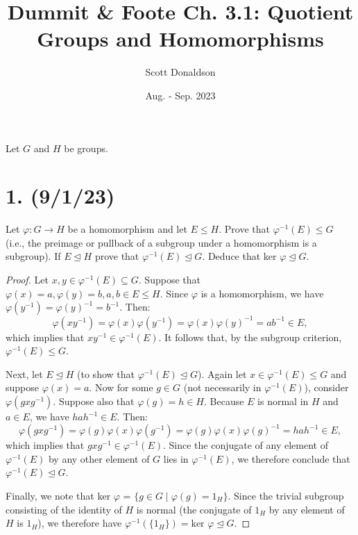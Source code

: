 \documentclass{article}
\title{Dummit \& Foote Ch. 3.1: Quotient Groups and Homomorphisms}
\author{Scott Donaldson}
\date{Aug. - Sep. 2023}
\begin{document}
\maketitle

Let $G$ and $H$ be groups.

\section*{1. (9/1/23)}

Let $\varphi: G \rightarrow H$ be a homomorphism and let $E \leq H$. Prove that $\varphi^{-1}(E) \leq G$ (i.e., the preimage or pullback of a subgroup under a homomorphism is a subgroup). If $E \unlhd H$ prove that $\varphi^{-1}(E) \unlhd G$. Deduce that ker $\varphi \unlhd G$. 

\begin{proof}
    Let $x, y \in \varphi^{-1}(E) \subseteq G$. Suppose that $\varphi(x) = a, \varphi(y) = b, a, b \in E \leq H$. Since $\varphi$ is a homomorphism, we have $\varphi(y^{-1}) = \varphi(y)^{-1} = b^{-1}$. Then:
    \begin{equation*}
        \varphi(xy^{-1}) = \varphi(x)\varphi(y^{-1}) = \varphi(x)\varphi(y)^{-1} = ab^{-1} \in E,
    \end{equation*}
    which implies that $xy^{-1} \in \varphi^{-1}(E)$. It follows that, by the subgroup criterion, $\varphi^{-1}(E) \leq G$.

    Next, let $E \unlhd H$ (to show that $\varphi^{-1}(E) \unlhd G$). Again let $x \in \varphi^{-1}(E) \leq G$ and suppose $\varphi(x) = a$. Now for some $g \in G$ (not necessarily in $\varphi^{-1}(E)$), consider $\varphi(gxg^{-1})$. Suppose also that $\varphi(g) = h \in H$. Because $E$ is normal in $H$ and $a \in E$, we have $hah^{-1} \in E$. Then:
    \begin{equation*}
        \varphi(gxg^{-1}) = \varphi(g)\varphi(x)\varphi(g^{-1}) = \varphi(g)\varphi(x)\varphi(g)^{-1} = hah^{-1} \in E,
    \end{equation*}
    which implies that $gxg^{-1} \in \varphi^{-1}(E)$. Since the conjugate of any element of $\varphi^{-1}(E)$ by any other element of $G$ lies in $\varphi^{-1}(E)$, we therefore conclude that $\varphi^{-1}(E) \unlhd G$.

    Finally, we note that ker $\varphi$ = $\{ g \in G \mid \varphi(g) = 1_H \}$. Since the trivial subgroup consisting of the identity of $H$ is normal (the conjugate of $1_H$ by any element of $H$ is $1_H$), we therefore have $\varphi^{-1}(\{ 1_H \}) = \text{ker } \varphi \unlhd G$.
\end{proof}
\end{document}
